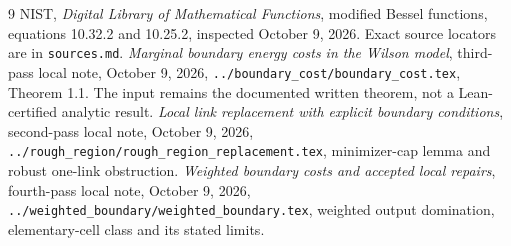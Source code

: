 \documentclass[11pt]{article}
\theoremstyle{definition}
\theoremstyle{remark}
\begin{document}
\begin{thebibliography}{9}
NIST, \emph{Digital Library of Mathematical Functions},
modified Bessel functions, equations 10.32.2 and 10.25.2, inspected
October 9, 2026. Exact source locators are in \texttt{sources.md}.
\emph{Marginal boundary energy costs in the Wilson model}, third-pass
local note, October 9, 2026,
\texttt{../boundary\_cost/boundary\_cost.tex}, Theorem 1.1.
The input remains the documented written theorem, not a Lean-certified
analytic result.
\emph{Local link replacement with explicit boundary conditions},
second-pass local note, October 9, 2026,
\texttt{../rough\_region/rough\_region\_replacement.tex}, minimizer-cap
lemma and robust one-link obstruction.
\emph{Weighted boundary costs and accepted local repairs}, fourth-pass
local note, October 9, 2026,
\texttt{../weighted\_boundary/weighted\_boundary.tex}, weighted output
domination, elementary-cell class and its stated limits.
\end{thebibliography}
\end{document}
